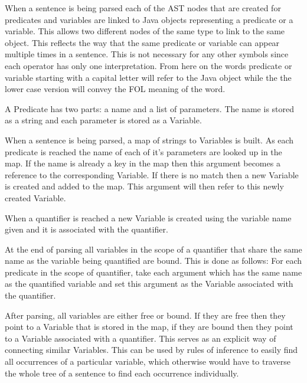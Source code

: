 When a sentence is being parsed each of the AST nodes that are created for predicates and variables are linked to Java objects representing a predicate or a variable.  This allows two different nodes of the same type to link to the same object. This reflects the way that the same predicate or variable can appear multiple times in a sentence. This is not necessary for any other symbols since each operator has only one interpretation. From here on the words predicate or variable starting with a capital letter will refer to the Java object while the the lower case version will convey the FOL meaning of the word.

A Predicate has two parts: a name and a list of parameters. The name is stored as a string and each parameter is stored as a Variable. 

When a sentence is being parsed, a map of strings to Variables is built. As each predicate is reached the name of each of it's parameters are looked up in the map. If the name is already a key in the map then this argument becomes a reference to the corresponding Variable. If there is no match then a new Variable is created and added to the map. This argument will then refer to this newly created Variable.

When a quantifier is reached a new Variable is created using the variable name given and it is associated with the quantifier.

At the end of parsing all variables in the scope of a quantifier that share the same name as the variable being quantified are bound. This is done as follows: For each predicate in the scope of quantifier, take each argument which has the same name as the quantified variable and set this argument as the Variable associated with the quantifier.

After parsing, all variables are either free or bound. If they are free then they point to a Variable that is stored in the map, if they are bound then they point to a Variable associated with a quantifier. This serves as an explicit way of connecting similar Variables. This can be used by rules of inference to easily find all occurrences of a particular variable, which otherwise would have to traverse the whole tree of a sentence to find each occurrence individually.

